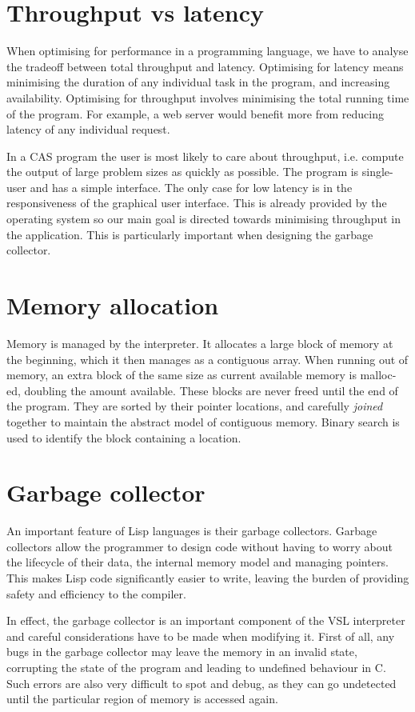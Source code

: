 \section{Throughput vs latency}
When optimising for performance in a programming language, we have to analyse the tradeoff between
total throughput and latency. Optimising for latency means minimising the duration of any individual
task in the program, and increasing availability. Optimising for throughput involves minimising the
total running time of the program. For example, a web server would benefit more from reducing latency
of any individual request.

In a CAS program the user is most likely to care about throughput, i.e. compute the output of large
problem sizes as quickly as possible. The program is single-user and has a simple interface. The only case
for low latency is in the responsiveness of the graphical user interface. This is already provided by the
operating system so our main goal is directed towards minimising throughput in the application.
This is particularly important when designing the garbage collector.

\section{Memory allocation}
Memory is managed by the interpreter. It allocates a large block of memory at the beginning,
which it then manages as a contiguous array. When running out of memory, an extra block of the
same size as current available memory is malloc-ed, doubling the amount available. These blocks are
never freed until the end of the program. They are sorted by their pointer locations,
and carefully \emph{joined} together to maintain the abstract model of contiguous memory. Binary search
is used to identify the block containing a location.

\section{Garbage collector}
An important feature of Lisp languages is their garbage collectors. Garbage collectors allow the programmer
to design code without having to worry about the lifecycle of their data, the internal memory model and
managing pointers. This makes Lisp code significantly easier to write, leaving the burden of providing safety and
efficiency to the compiler.

In effect, the garbage collector is an important component of the VSL interpreter and careful considerations
have to be made when modifying it. First of all, any bugs in the garbage collector may leave the memory in
an invalid state, corrupting the state of the program and leading to undefined behaviour in C. Such errors
are also very difficult to spot and debug, as they can go undetected until the particular region of memory
is accessed again.

